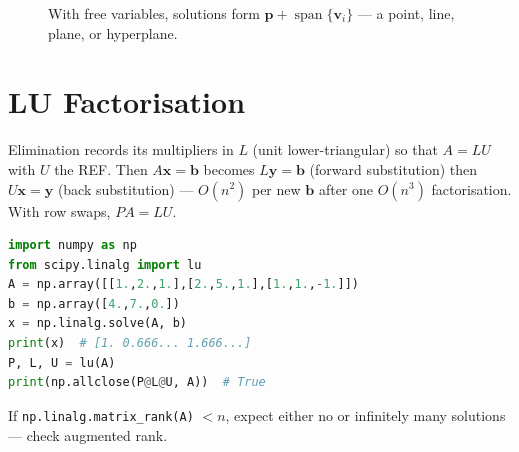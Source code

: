 \begin{figure}[h]
\centering
{}
\caption{With free variables, solutions form $\mathbf{p}+\operatorname{span}\{\mathbf{v}_i\}$ --- a point, line, plane, or hyperplane.}
\label{fig:solution-affine}
\end{figure}

\section{LU Factorisation}
\label{sec:lu}
Elimination records its multipliers in $L$ (unit lower-triangular) so that $A=LU$ with $U$ the REF. Then $A\mathbf{x}=\mathbf{b}$ becomes $L\mathbf{y}=\mathbf{b}$ (forward substitution) then $U\mathbf{x}=\mathbf{y}$ (back substitution) --- $O(n^2)$ per new $\mathbf{b}$ after one $O(n^3)$ factorisation. With row swaps, $PA=LU$.

\begin{example}
\begin{lstlisting}[language=Python]
import numpy as np
from scipy.linalg import lu
A = np.array([[1.,2.,1.],[2.,5.,1.],[1.,1.,-1.]])
b = np.array([4.,7.,0.])
x = np.linalg.solve(A, b)
print(x)  # [1. 0.666... 1.666...]
P, L, U = lu(A)
print(np.allclose(P@L@U, A))  # True
\end{lstlisting}
If \texttt{np.linalg.matrix\_rank(A)} $<n$, expect either no or infinitely many solutions --- check augmented rank.
\end{example}


